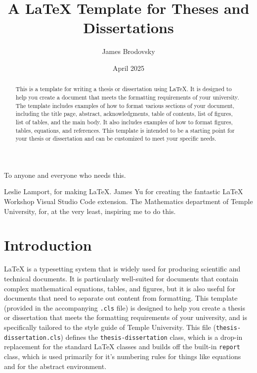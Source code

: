 \documentclass{thesis-dissertation}
\title{A \LaTeX{} Template for Theses and Dissertations}
\author{James Brodovsky}        %
\date{April 2025}               %
\begin{document}
\newtheorem{notation}{Notation}[chapter]
\newtheorem{rem}{Remark}[chapter]
\newtheorem{lem}{Lemma}[chapter]
\newtheorem{cor}{Corollary}[chapter]
\newtheorem{tem}{Theorem}[chapter]
\newtheorem{prop}{Proposition}[chapter]
\newtheorem{example}{Example}[chapter]
\newtheorem{define}{Definition}[chapter]

\maketitlepage{}

\begin{abstract}
  This is a template for writing a thesis or dissertation using \LaTeX{}. It is designed to help you create a document that meets the formatting requirements of your university. The template includes examples of how to format various sections of your document, including the title page, abstract, acknowledgments, table of contents, list of figures, list of tables, and the main body. It also includes examples of how to format figures, tables, equations, and references. This template is intended to be a starting point for your thesis or dissertation and can be customized to meet your specific needs.
\end{abstract}

\begin{dedication}
  To anyone and everyone who needs this.
\end{dedication}

\begin{acknowledgments}
  Leslie Lamport, for making \LaTeX{}. James Yu for creating the fantastic LaTeX Workshop Visual Studio Code extension. The Mathematics department of Temple University, for, at the very least, inspiring me to do this.
\end{acknowledgments}

\singlespacing{}
\tableofcontents{}
\listoftables{}
\listoffigures{}

\mainmatter

\chapter{Introduction}
\LaTeX{} is a typesetting system that is widely used for producing scientific and technical documents. It is particularly well-suited for documents that contain complex mathematical equations, tables, and figures, but it is also useful for documents that need to separate out content from formatting. This template (provided in the accompanying \texttt{.cls} file) is designed to help you create a thesis or dissertation that meets the formatting requirements of your university, and is specifically tailored to the style guide of Temple University. This file (\texttt{thesis-dissertation.cls}) defines the \texttt{thesis-dissertation} class, which is a drop-in replacement for the standard \LaTeX{} classes and builds off the built-in \texttt{report} class, which is used primarily for it's numbering rules for things like equations and for the abstract environment.
\end{document}
